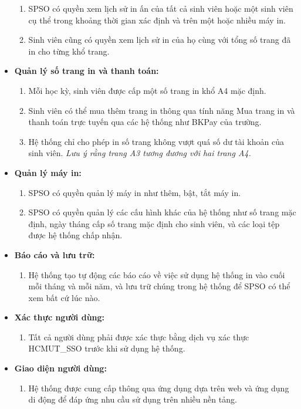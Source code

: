 \begin{itemize}
\begin{enumerate}[- ]
        \item SPSO có quyền xem lịch sử in ấn của tất cả sinh viên hoặc một sinh viên cụ thể trong khoảng thời gian xác định và trên một hoặc nhiều máy in.
        \item Sinh viên cũng có quyền xem lịch sử in của họ cùng với tổng số trang đã in cho từng khổ trang.
    \end{enumerate}
    \item \textbf{Quản lý số trang in và thanh toán:}
    \begin{enumerate}[- ]
        \item Mỗi học kỳ, sinh viên được cấp một số trang in khổ A4 mặc định.
        \item Sinh viên có thể mua thêm trang in thông qua tính năng Mua trang in và thanh toán trực tuyến qua các hệ thống như BKPay của trường.
        \item Hệ thống chỉ cho phép in số trang không vượt quá số dư tài khoản của sinh viên. \textit{Lưu ý rằng trang A3 tương đương với hai trang A4.}
    \end{enumerate}
    \item \textbf{Quản lý máy in:}
    \begin{enumerate}[- ]
        \item SPSO có quyền quản lý máy in như thêm, bật, tắt máy in.
        \item SPSO có quyền quản lý các cấu hình khác của hệ thống như số trang mặc định, ngày tháng cấp số trang mặc định cho sinh viên, và các loại tệp được hệ thống chấp nhận.
    \end{enumerate}
    \item \textbf{Báo cáo và lưu trữ:}
    \begin{enumerate}[- ]
        \item Hệ thống tạo tự động các báo cáo về việc sử dụng hệ thống in vào cuối mỗi tháng và mỗi năm, và lưu trữ chúng trong hệ thống để SPSO có thể xem bất cứ lúc nào.
    \end{enumerate}
    \item \textbf{Xác thực người dùng:}
    \begin{enumerate}[- ]
        \item Tất cả người dùng phải được xác thực bằng dịch vụ xác thực HCMUT\_SSO trước khi sử dụng hệ thống.
    \end{enumerate}
    \item \textbf{Giao diện người dùng:}
    \begin{enumerate}[- ]
        \item Hệ thống được cung cấp thông qua ứng dụng dựa trên web và ứng dụng di động để đáp ứng nhu cầu sử dụng trên nhiều nền tảng.
    \end{enumerate}
\end{itemize}

